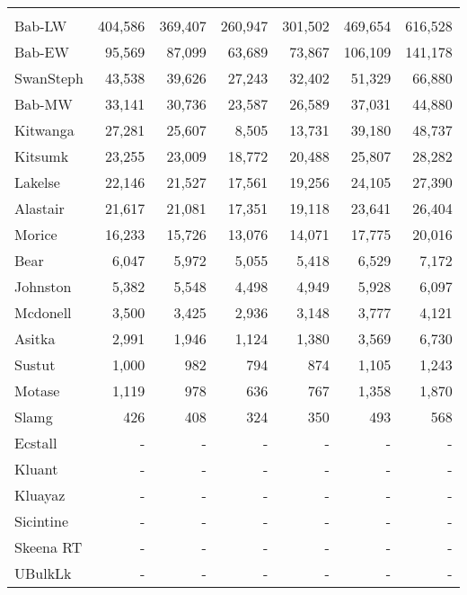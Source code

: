 \documentclass[french,11pt]{book}
\begin{document}
\begin{longtable}[t]{lrrrrrr}
\midrule\\ Bab-LW & 404,586 & 369,407 & 260,947 & 301,502 & 469,654 & 616,528\\ Bab-EW & 95,569 & 87,099 & 63,689 & 73,867 & 106,109 & 141,178\\ SwanSteph & 43,538 & 39,626 & 27,243 & 32,402 & 51,329 & 66,880\\ Bab-MW & 33,141 & 30,736 & 23,587 & 26,589 & 37,031 & 44,880\\ Kitwanga & 27,281 & 25,607 & 8,505 & 13,731 & 39,180 & 48,737\\ Kitsumk & 23,255 & 23,009 & 18,772 & 20,488 & 25,807 & 28,282\\ Lakelse & 22,146 & 21,527 & 17,561 & 19,256 & 24,105 & 27,390\\ Alastair & 21,617 & 21,081 & 17,351 & 19,118 & 23,641 & 26,404\\ Morice & 16,233 & 15,726 & 13,076 & 14,071 & 17,775 & 20,016\\ Bear & 6,047 & 5,972 & 5,055 & 5,418 & 6,529 & 7,172\\ Johnston & 5,382 & 5,548 & 4,498 & 4,949 & 5,928 & 6,097\\ Mcdonell & 3,500 & 3,425 & 2,936 & 3,148 & 3,777 & 4,121\\ Asitka & 2,991 & 1,946 & 1,124 & 1,380 & 3,569 & 6,730\\ Sustut & 1,000 & 982 & 794 & 874 & 1,105 & 1,243\\ Motase & 1,119 & 978 & 636 & 767 & 1,358 & 1,870\\ Slamg & 426 & 408 & 324 & 350 & 493 & 568\\ Ecstall & - & - & - & - & - & -\\ Kluant & - & - & - & - & - & -\\ Kluayaz & - & - & - & - & - & -\\ Sicintine & - & - & - & - & - & -\\ Skeena RT & - & - & - & - & - & -\\ UBulkLk & - & - & - & - & - & -\\* \end{longtable}

\endgroup{} \endgroup{}

\clearpage
\end{document}
